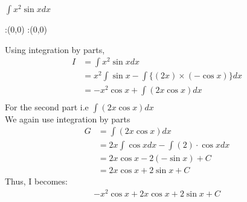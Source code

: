 



\question[5] $\int x^2 \sin x dx $


\watchout

\ifprintanswers
  \begin{marginfigure}
      :(0,0)
      :(0,0)
    \figdrawbegin{}
      \figdrawline [100,101]
    \figdrawend
    \figvisu{\figBoxA}{}{%
    }
    \centerline{\box\figBoxA}
  \end{marginfigure}
\fi 

\begin{solution}[\halfpage]
Using integration by parts,
\begin{align}
I &= \int x^2 \sin x dx\\
&= x^2 \int \sin x - \int \lbrace (2x)\times (-\cos x) \rbrace dx \\
&= -x^2 \cos x + \int (2x \cos x) dx\\
\end{align} 
For the second part i.e $\int (2x \cos x) dx$\\
We again use integration by parts
\begin{align}
G &= \int (2x \cos x) dx\\
&= 2x \int \cos x dx - \int (2)\cdot \cos x dx \\
&= 2x \cos x - 2 (-\sin x ) + C\\
&= 2x \cos x + 2 \sin x + C  
\end{align}  
Thus, I becomes:
\begin{align}
-x^{2}\cos x + 2x \cos x + 2 \sin x + C 
\end{align} 
\end{solution}

